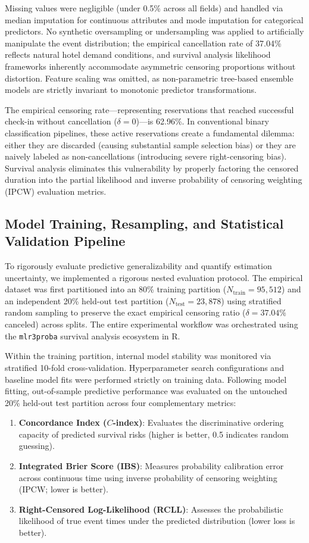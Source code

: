 \documentclass[pdflatex,iicol,sn-mathphys-ay]{sn-jnl}
\theoremstyle{thmstyleone}%
\theoremstyle{thmstyletwo}%
\theoremstyle{thmstylethree}%
\begin{document}
Missing values were negligible (under 0.5\% across all fields) and handled via median imputation for continuous attributes and mode imputation for categorical predictors. No synthetic oversampling or undersampling was applied to artificially manipulate the event distribution; the empirical cancellation rate of 37.04\% reflects natural hotel demand conditions, and survival analysis likelihood frameworks inherently accommodate asymmetric censoring proportions without distortion. Feature scaling was omitted, as non-parametric tree-based ensemble models are strictly invariant to monotonic predictor transformations.

The empirical censoring rate—representing reservations that reached successful check-in without cancellation ($\delta = 0$)—is 62.96\%. In conventional binary classification pipelines, these active reservations create a fundamental dilemma: either they are discarded (causing substantial sample selection bias) or they are naively labeled as non-cancellations (introducing severe right-censoring bias). Survival analysis eliminates this vulnerability by properly factoring the censored duration into the partial likelihood and inverse probability of censoring weighting (IPCW) evaluation metrics.

\subsection{Model Training, Resampling, and Statistical Validation Pipeline}
\label{sec:experiments}

To rigorously evaluate predictive generalizability and quantify estimation uncertainty, we implemented a rigorous nested evaluation protocol. The empirical dataset was first partitioned into an 80\% training partition ($N_{\text{train}} = 95{,}512$) and an independent 20\% held-out test partition ($N_{\text{test}} = 23{,}878$) using stratified random sampling to preserve the exact empirical censoring ratio ($\delta = 37.04\%$ canceled) across splits. The entire experimental workflow was orchestrated using the \texttt{mlr3proba} survival analysis ecosystem in R.

Within the training partition, internal model stability was monitored via stratified 10-fold cross-validation. Hyperparameter search configurations and baseline model fits were performed strictly on training data. Following model fitting, out-of-sample predictive performance was evaluated on the untouched 20\% held-out test partition across four complementary metrics:
\begin{enumerate}
    \item \textbf{Concordance Index ($C$-index)}: Evaluates the discriminative ordering capacity of predicted survival risks (higher is better, 0.5 indicates random guessing).
    \item \textbf{Integrated Brier Score (IBS)}: Measures probability calibration error across continuous time using inverse probability of censoring weighting (IPCW; lower is better).
    \item \textbf{Right-Censored Log-Likelihood (RCLL)}: Assesses the probabilistic likelihood of true event times under the predicted distribution (lower loss is better).
\end{enumerate}
\end{document}

